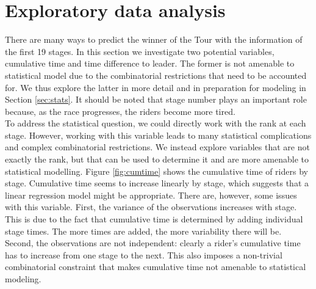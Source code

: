 \documentclass[aos,preprint]{imsart}
\begin{document}
\section{Exploratory data analysis} \label{sec:eda}


There are many ways to predict the winner of the Tour with the information of the first 19 stages. In this section we investigate two potential variables, cumulative time and time difference to leader. The former is not amenable to statistical model due to the combinatorial restrictions that need to be accounted for. We thus explore the latter in more detail and in preparation for modeling in Section \ref{sec:stats}. It should be noted that stage number plays an important role because, as the race progresses, the riders become more tired. \\




To address the statistical question, we could directly work with the rank at each stage. However, working with this variable leads to many statistical complications and complex combinatorial restrictions. We instead explore variables that are not exactly the rank, but that can be used to determine it and are more amenable to statistical modelling. Figure \ref{fig:cumtime} shows the cumulative time of riders by stage. Cumulative time seems to increase linearly by stage, which suggests that a linear regression model might be appropriate. There are, however, some issues with this variable. First, the variance of the observations increases with stage. This is due to the fact that cumulative time is determined by adding individual stage times. The more times are added, the more variability there will be. Second, the observations are not independent: clearly a rider's cumulative time has to increase from one stage to the next. This also imposes a non-trivial combinatorial constraint that makes cumulative time not amenable to statistical modeling. \\
\end{document}
